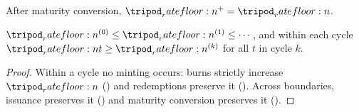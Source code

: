 \documentclass[../main.tex]{subfiles}
\begin{document}
\begin{proposition}
    \label{prop:invariants:maturity-preserves-floor}
    After maturity conversion, $\ratefloor{}^{+} = \ratefloor{}$.
\end{proposition}

\begin{theorem}
    \label{thm:invariants:floor-non-decrease}
    $\ratefloor{}^{(0)} \leq \ratefloor{}^{(1)} \leq \cdots$, and within each cycle
    $\ratefloor{t} \geq \ratefloor{}^{(k)}$ for all $t$ in cycle $k$.
\end{theorem}
\begin{proof}
    Within a cycle no minting occurs: burns strictly increase $\ratefloor{}$
    () and redemptions preserve it
    (). Across boundaries, issuance
    preserves it () and maturity conversion
    preserves it ().
\end{proof}

\end{document}
